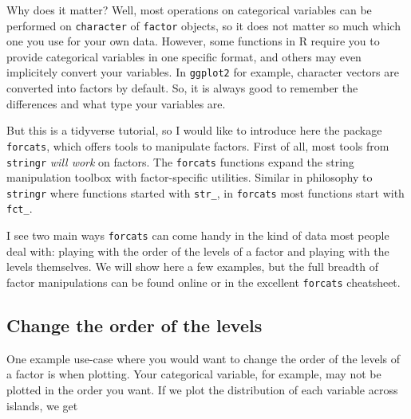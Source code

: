 \documentclass[]{book}
\begin{document}
Why does it matter? Well, most operations on categorical variables can be performed on \texttt{character} of \texttt{factor} objects, so it does not matter so much which one you use for your own data. However, some functions in R require you to provide categorical variables in one specific format, and others may even implicitely convert your variables. In \texttt{ggplot2} for example, character vectors are converted into factors by default. So, it is always good to remember the differences and what type your variables are.

But this is a tidyverse tutorial, so I would like to introduce here the package \texttt{forcats}, which offers tools to manipulate factors. First of all, most tools from \texttt{stringr} \emph{will work} on factors. The \texttt{forcats} functions expand the string manipulation toolbox with factor-specific utilities. Similar in philosophy to \texttt{stringr} where functions started with \texttt{str\_}, in \texttt{forcats} most functions start with \texttt{fct\_}.

I see two main ways \texttt{forcats} can come handy in the kind of data most people deal with: playing with the order of the levels of a factor and playing with the levels themselves. We will show here a few examples, but the full breadth of factor manipulations can be found online or in the excellent \texttt{forcats} cheatsheet.

\hypertarget{change-the-order-of-the-levels}{%
\subsection{Change the order of the levels}\label{change-the-order-of-the-levels}}

One example use-case where you would want to change the order of the levels of a factor is when plotting. Your categorical variable, for example, may not be plotted in the order you want. If we plot the distribution of each variable across islands, we get
\end{document}
